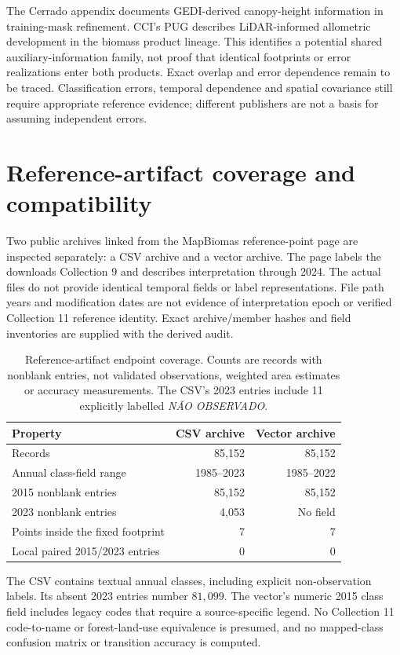 \documentclass[11pt,a4paper]{article}
\begin{document}
The Cerrado appendix documents GEDI-derived canopy-height information in training-mask refinement. CCI's PUG describes LiDAR-informed allometric development in the biomass product lineage. This identifies a potential shared auxiliary-information family, not proof that identical footprints or error realizations enter both products. Exact overlap and error dependence remain to be traced. Classification errors, temporal dependence and spatial covariance still require appropriate reference evidence; different publishers are not a basis for assuming independent errors.

\section{Reference-artifact coverage and compatibility}

Two public archives linked from the MapBiomas reference-point page are inspected separately: a CSV archive and a vector archive. The page labels the downloads Collection 9 and describes interpretation through 2024. The actual files do not provide identical temporal fields or label representations. File path years and modification dates are not evidence of interpretation epoch or verified Collection 11 reference identity. Exact archive/member hashes and field inventories are supplied with the derived audit.

\begin{table}[htbp]
\centering\small
\caption{Reference-artifact endpoint coverage. Counts are records with nonblank entries, not validated observations, weighted area estimates or accuracy measurements. The CSV's 2023 entries include 11 explicitly labelled \emph{N\~AO OBSERVADO}.}\label{tab:reference_coverage}
\begin{tabular}{lrr}
\toprule
Property & CSV archive & Vector archive\\\midrule
Records & 85,152 & 85,152\\
Annual class-field range & 1985--2023 & 1985--2022\\
2015 nonblank entries & 85,152 & 85,152\\
2023 nonblank entries & 4,053 & No field\\
Points inside the fixed footprint & 7 & 7\\
Local paired 2015/2023 entries & 0 & 0\\\bottomrule
\end{tabular}
\end{table}

The CSV contains textual annual classes, including explicit non-observation labels. Its absent 2023 entries number $81{,}099$. The vector's numeric 2015 class field includes legacy codes that require a source-specific legend. No Collection 11 code-to-name or forest-land-use equivalence is presumed, and no mapped-class confusion matrix or transition accuracy is computed.
\end{document}
